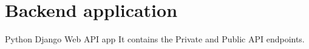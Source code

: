 \section{Backend application}\label{sec:backend-application}
Python Django Web API app %
It contains the Private and Public API endpoints.